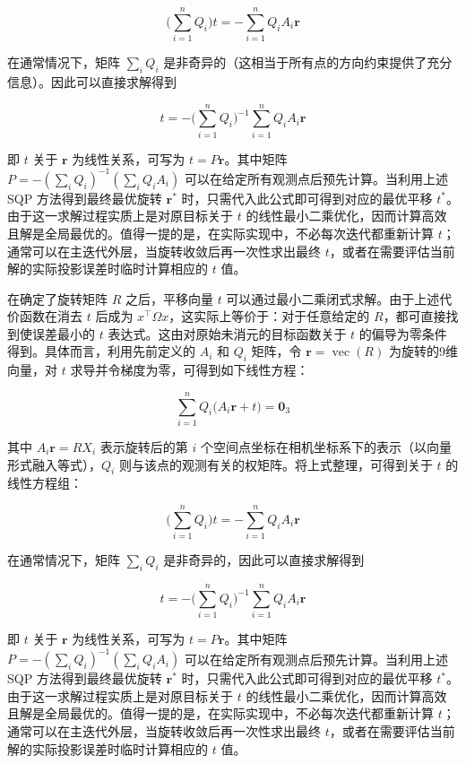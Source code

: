 \begin{equation} 
	\Big(\sum_{i=1}^n Q_i\Big)  t = - \sum_{i=1}^n Q_i A_i \mathbf{r}
\end{equation}

在通常情况下，矩阵 $\sum_i Q_i$ 是非奇异的（这相当于所有点的方向约束提供了充分信息）。因此可以直接求解得到

\begin{equation} 
	t = -\Big(\sum_{i=1}^n Q_i\Big)^{-1} \sum_{i=1}^n Q_i A_i \mathbf{r}  
\end{equation}

即 $t$ 关于 $\mathbf{r}$ 为线性关系，可写为 $t = P \mathbf{r}$。其中矩阵 $P = -(\sum_i Q_i)^{-1}(\sum_i Q_i A_i)$ 可以在给定所有观测点后预先计算。当利用上述 SQP 方法得到最终最优旋转 $\mathbf{r}^*$ 时，只需代入此公式即可得到对应的最优平移 $t^*$。由于这一求解过程实质上是对原目标关于 $t$ 的线性最小二乘优化，因而计算高效且解是全局最优的。值得一提的是，在实际实现中，不必每次迭代都重新计算 $t$；通常可以在主迭代外层，当旋转收敛后再一次性求出最终 $t$，或者在需要评估当前解的实际投影误差时临时计算相应的 $t$ 值。

在确定了旋转矩阵 $R$ 之后，平移向量 $t$ 可以通过最小二乘闭式求解。由于上述代价函数在消去 $t$ 后成为 $x^\top \Omega x$，这实际上等价于：对于任意给定的 $R$，都可直接找到使误差最小的 $t$ 表达式。这由对原始未消元的目标函数关于 $t$ 的偏导为零条件得到。具体而言，利用先前定义的 $A_i$ 和 $Q_i$ 矩阵，令 $\mathbf{r} = \operatorname{vec}(R)$ 为旋转的9维向量，对 $t$ 求导并令梯度为零，可得到如下线性方程：

\begin{equation}
	\sum_{i=1}^n Q_i  \big(A_i \mathbf{r} + t\big) = \mathbf{0}_3
\end{equation}

其中 $A_i \mathbf{r} = R X_i$ 表示旋转后的第 $i$ 个空间点坐标在相机坐标系下的表示（以向量形式融入等式），$Q_i$ 则与该点的观测有关的权矩阵。将上式整理，可得到关于 $t$ 的线性方程组：

\begin{equation}
	\Big(\sum_{i=1}^n Q_i\Big) t  = - \sum_{i=1}^n Q_i A_i \mathbf{r}
\end{equation}

在通常情况下，矩阵 $\sum_i Q_i$ 是非奇异的，因此可以直接求解得到

\begin{equation}
	t  = - \Big(\sum_{i=1}^n Q_i\Big)^{-1} \sum_{i=1}^n Q_i A_i \mathbf{r}
\end{equation}

即 $t$ 关于 $\mathbf{r}$ 为线性关系，可写为 $t = P \mathbf{r}$。其中矩阵 $P = -(\sum_i Q_i)^{-1}(\sum_i Q_i A_i)$ 可以在给定所有观测点后预先计算。当利用上述 SQP 方法得到最终最优旋转 $\mathbf{r}^*$ 时，只需代入此公式即可得到对应的最优平移 $t^*$。由于这一求解过程实质上是对原目标关于 $t$ 的线性最小二乘优化，因而计算高效且解是全局最优的。值得一提的是，在实际实现中，不必每次迭代都重新计算 $t$；通常可以在主迭代外层，当旋转收敛后再一次性求出最终 $t$，或者在需要评估当前解的实际投影误差时临时计算相应的 $t$ 值。

